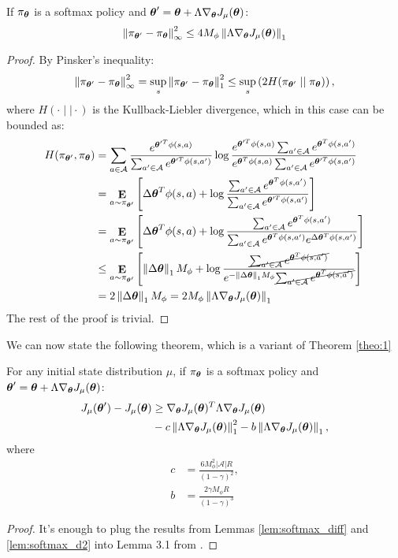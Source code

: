 \begin{lemma}\label{lem:softmax_infnorm}
If $\pi_{\vtheta}$ is a softmax policy and $\vtheta' = \vtheta+\Lambda\gradJ{\vtheta}$:
\[
	\norm[\infty]{\pi_{\vtheta'} - \pi_{\vtheta}}^2 \leq 4M_\phi\norm[1]{\Lambda\gradJ{\vtheta}}
\]
\end{lemma}
\begin{proof}
By Pinsker's inequality:
\begin{align*}
\norm[\infty]{\pi_{\vtheta'} - \pi_{\vtheta}}^2 = \sup_s\norm[1]{\pi_{\vtheta'} - \pi_{\vtheta}}^2 \leq \sup_s\left(2H(\pi_{\vtheta'}\mid\mid\pi_{\vtheta})\right),
\end{align*}
where $H(\cdot\mid\mid\cdot)$ is the Kullback-Liebler divergence, which in this case can be bounded as:
\begin{align*}
H(\pi_{\vtheta'},\pi_{\vtheta}) &= 
\sum_{a \in \mathcal{A}}
	\frac{e^{\vtheta'^T\phi(s,a)}}{\sum_{a'\in\mathcal{A}}e^{\vtheta'^T\phi(s,a')}}
	\log\frac{e^{\vtheta'^T\phi(s,a)}\sum_{a'\in\mathcal{A}}e^{\vtheta^T\phi(s,a')}}
	{e^{\vtheta^T\phi(s,a)}\sum_{a'\in\mathcal{A}}e^{\vtheta'^T\phi(s,a')}} \\
	&= \expected{a}{\pi_{\vtheta'}}{
	\Delta\vtheta^T\phi(s,a) + \log\frac{\sum_{a'\in\mathcal{A}}e^{\vtheta^T\phi(s,a')}}
	{\sum_{a'\in\mathcal{A}}e^{\vtheta'^T\phi(s,a')}}} \\
	&= \expected{a}{\pi_{\vtheta'}}{
	\Delta\vtheta^T\phi(s,a) + \log\frac{\sum_{a'\in\mathcal{A}}e^{\vtheta^T\phi(s,a')}}		{\sum_{a'\in\mathcal{A}}e^{\vtheta^T\phi(s,a')}e^{\Delta\vtheta^T\phi(s,a')}}} \\
	&\leq \expected{a}{\pi_{\vtheta'}}{
	\norm[1]{\Delta\vtheta}M_\phi + \log\frac{\cancel{\sum_{a'\in\mathcal{A}}e^{\vtheta^T\phi(s,a')}}}
	{e^{-\norm[1]{\Delta\vtheta}M_\phi}\cancel{\sum_{a'\in\mathcal{A}}e^{\vtheta^T\phi(s,a')}}}} \\
	&= 2\norm[1]{\Delta\vtheta}M_\phi = 2M_\phi\norm[1]{\Lambda\gradJ{\vtheta}} 	
\end{align*}
The rest of the proof is trivial.
\end{proof}

We can now state the following theorem, which is a variant of Theorem \ref{theo:1}

\begin{theorem}\label{theo:softmax1}
For any initial state distribution $\mu$, if $\pi_{\vtheta}$ is a softmax policy and $\vtheta' = \vtheta+\Lambda\gradJ{\vtheta}$:
\begin{align*}
\DeltaJ &\geq \gradJ{\vtheta}^T\Lambda\gradJ{\vtheta} \\
	&-c\norm[1]{\Lambda\gradJ{\vtheta}}^2 -
	b\norm[1]{\Lambda\gradJ{\vtheta}},
\end{align*}
where
\begin{align*}
c &= \frac{6M_{\phi}^2|\mathcal{A}|R}{(1-\gamma)^2}, \\
b &=  \frac{2\gamma M_{\phi}R}{(1-\gamma)^3}
\end{align*}
\end{theorem}
\begin{proof}
It's enough to plug the results from Lemmas \ref{lem:softmax_diff} and \ref{lem:softmax_d2} into Lemma 3.1 from \cite{NIPS2013_5186}.
\end{proof}

